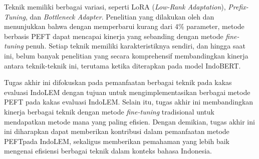 Teknik \PEFT memiliki berbagai variasi, seperti LoRA (\textit{Low-Rank Adaptation}), \textit{Prefix-Tuning}, dan \textit{Bottleneck Adapter}. Penelitian yang dilakukan oleh \citeauthor{adapter} \parencite{adapter} dan \citeauthor{uvpl} \parencite{uvpl} menunjukkan bahwa dengan memperbarui kurang dari 4\% parameter, metode berbasis PEFT dapat mencapai kinerja yang sebanding dengan metode \textit{fine-tuning} penuh. Setiap teknik memiliki karakteristiknya sendiri, dan hingga saat ini, belum banyak penelitian yang secara komprehensif membandingkan kinerja antara teknik-teknik ini, terutama ketika diterapkan pada model IndoBERT. 

Tugas akhir ini  difokuskan pada pemanfaatan berbagai teknik \PEFT pada kakas evaluasi IndoLEM dengan tujuan untuk mengimplementasikan berbagai metode PEFT pada kakas evaluasi IndoLEM. Selain itu, tugas akhir ini  membandingkan kinerja berbagai teknik \PEFT dengan metode \textit{fine-tuning} tradisional untuk mendapatkan metode mana yang paling efisien. Dengan demikian, tugas akhir ini ini diharapkan dapat memberikan kontribusi dalam pemanfaatan metode PEFTpada IndoLEM, sekaligus memberikan pemahaman yang lebih baik mengenai efisiensi berbagai teknik \PEFT dalam konteks bahasa Indonesia.
